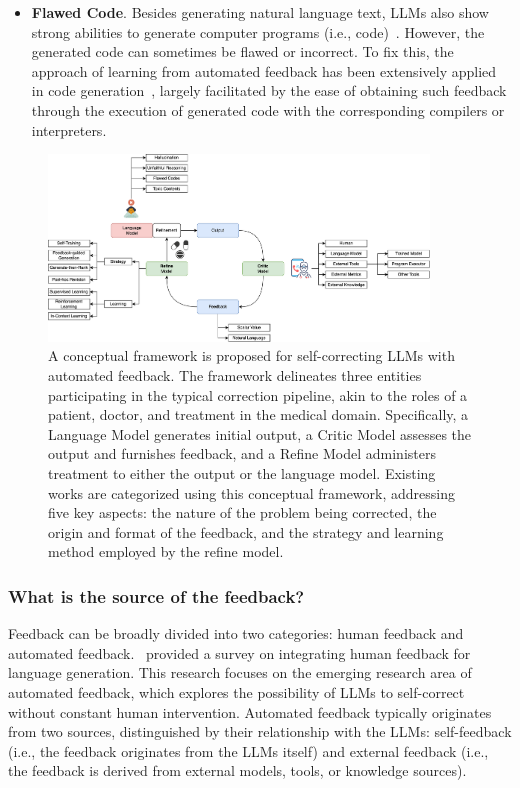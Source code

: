 \documentclass[12pt]{extarticle}
\begin{document}
\begin{itemize}
    \item \textbf{Flawed Code}. Besides generating natural language text, LLMs also show strong abilities to generate computer programs (i.e., code)~\cite{chen2022codet}. However, the generated code can sometimes be flawed or incorrect. To fix this, the approach of learning from automated feedback has been extensively applied in code generation~\cite{chen2023teaching, olausson2023selfrepair}, largely facilitated by the ease of obtaining such feedback through the execution of generated code with the corresponding compilers or interpreters.
\end{itemize}

\begin{figure}[h!]
    \centering
    \includegraphics[width=0.90\textwidth]{img/taxonomy.png}
    \caption{A conceptual framework is proposed for self-correcting LLMs with automated feedback. The framework delineates three entities participating in the typical correction pipeline, akin to the roles of a patient, doctor, and treatment in the medical domain. Specifically, a Language Model generates initial output, a Critic Model assesses the output and furnishes feedback, and a Refine Model administers treatment to either the output or the language model. Existing works are categorized using this conceptual framework, addressing five key aspects: the nature of the problem being corrected, the origin and format of the feedback, and the strategy and learning method employed by the refine model.}\label{fig:taxonomy}
\end{figure}

\subsubsection{What is the source of the feedback?}
Feedback can be broadly divided into two categories: human feedback and automated feedback.~\cite{fernandes2023bridging} provided a survey on integrating human feedback for language generation. This research focuses on the emerging research area of automated feedback, which explores the possibility of LLMs to self-correct without constant human intervention. Automated feedback typically originates from two sources, distinguished by their relationship with the LLMs: self-feedback (i.e., the feedback originates from the LLMs itself) and external feedback (i.e., the feedback is derived from external models, tools, or knowledge sources).
\end{document}

